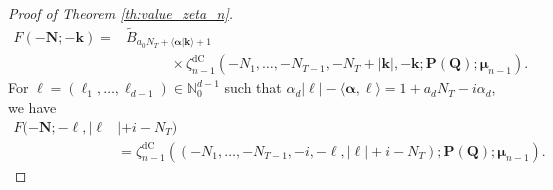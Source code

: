 \documentclass[10pt,a4paper]{amsart}
\newcommand{\dc}{\mathrm{dC}}
\begin{document}
\begin{proof}[Proof of Theorem \ref{th:value_zeta_n}]
\begin{align*}
    F(-\mathbf{N};-\mathbf{k})=&\widetilde{B}_{a_0N_T+\langle \boldsymbol{\alpha}|\mathbf{k}\rangle+1} \\
    & \hspace{38pt} \times \zeta_{n-1}^{\dc}(-N_1,\ldots,-N_{T-1},-N_T+|\mathbf{k}|,-\mathbf{k};\mathbf{P(Q)};\boldsymbol{\mu}_{n-1}).
\end{align*}
For $\boldsymbol{\ell}=(\ell_1,\ldots,\ell_{d-1}) \in \mathbb{N}_0^{d-1}$ such that $\alpha_d|\boldsymbol{\ell}|-\langle \boldsymbol{\alpha},\boldsymbol{\ell}\rangle=1+a_dN_T-i\alpha_d$, we have
\begin{align*}
    F(-\mathbf{N};-\boldsymbol{\ell},|\boldsymbol{\ell}&|+i-N_T) \\
    &= \zeta_{n-1}^{\dc}\left((-N_1,\ldots,-N_{T-1},-i,-\boldsymbol{\ell},|\boldsymbol{\ell}|+i-N_T);\mathbf{P(Q)};\boldsymbol{\mu}_{n-1}\right).
\end{align*}
\end{proof}
\end{document}
